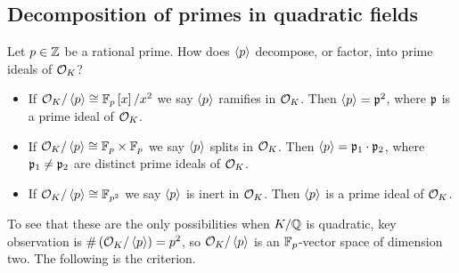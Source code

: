 \pagebreak

\subsection{Decomposition of primes in quadratic fields}

Let $ p \in \Z $ be a rational prime. How does $ \ab{p} $ decompose, or factor, into prime ideals of $ \OO_K $?
\begin{itemize}
\item If $ \OO_K / \ab{p} \cong \F_p\sb{x} / x^2 $ we say $ \ab{p} $ ramifies in $ \OO_K $. Then $ \ab{p} = \pp^2 $, where $ \pp $ is a prime ideal of $ \OO_K $.
\item If $ \OO_K / \ab{p} \cong \F_p \times \F_p $ we say $ \ab{p} $ splits in $ \OO_K $. Then $ \ab{p} = \pp_1 \cdot \pp_2 $, where $ \pp_1 \ne \pp_2 $ are distinct prime ideals of $ \OO_K $.
\item If $ \OO_K / \ab{p} \cong \F_{p^2} $ we say $ \ab{p} $ is inert in $ \OO_K $. Then $ \ab{p} $ is a prime ideal of $ \OO_K $.
\end{itemize}
To see that these are the only possibilities when $ K / \Q $ is quadratic, key observation is $ \#\rb{\OO_K / \ab{p}} = p^2 $, so $ \OO_K / \ab{p} $ is an $ \F_p $-vector space of dimension two. The following is the criterion.


